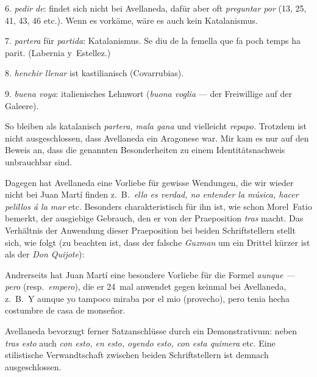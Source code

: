 6. {\it pedir de\/}: findet sich nicht bei Avellaneda, dafür aber oft
{\it preguntar por} (13, 25, 41, 43, 46 etc.).
Wenn es vorkäme, wäre es auch kein Katalanismus.

7. {\it partera} für {\it partida\/}: Katalanismus. {\itquoted Se diu de la femella que
fa poch temps ha parit.} (Labernia y~Estellez.)

8. {\it henchir \longeq llenar} ist kastilianisch (Covarrubias).

9. {\it buena voya\/}: italienisches Lehnwort ({\it buona voglia} --- der
Freiwillige auf der Galeere).

So bleiben als katalanisch {\it partera, mala gana} und vielleicht {\it repapo.}
Trotzdem ist nicht ausgeschlossen, dass Avellaneda ein Aragonese war.
Mir kam es nur auf den Beweis an, dass die genannten Besonderheiten
zu einem Identitätsnachweis unbrauchbar sind.

Dagegen hat Avellaneda eine Vorliebe für gewisse Wendungen,
die wir wieder nicht bei Juan Martí finden z.~B.\ {\it ello es verdad, no
entender la música, hacer pelillos á la mar} etc. Besonders charakteristisch
für ihn ist, wie schon Morel~Fatio bemerkt, der ausgiebige
Gebrauch, den er von der Praeposition {\it tras} macht. Das Verhältnis der
Anwendung dieser Praeposition bei beiden Schriftstellern stellt sich,
wie folgt (zu beachten ist, dass der falsche {\it Guzman} um ein Drittel
kürzer ist als der {\it Don Quijote\/}):


Andrerseits hat Juan Martí eine besondere Vorliebe für die Formel
{\it aunque --- pero} (resp.~{\it empero}), die er 24~mal anwendet gegen keinmal
bei Avellaneda, z.~B.\ {\itquoted\spanish Y aunque yo tampoco miraba por el mio {\rm (provecho),}
pero tenia hecha costumbre de casa de monseñor.}

Avellaneda bevorzugt ferner Satzanschlüsse durch ein Demonstrativum:
neben {\it tras esto} auch {\it con esto, en esto, oyendo esto, con esta
quimera} etc. Eine stilistische Verwandtschaft zwischen beiden
Schriftstellern ist demnach ausgeschlossen.

